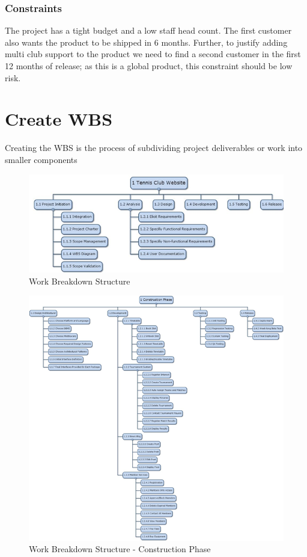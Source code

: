 \subsubsection{Constraints}

The project has a tight budget and a low staff head count. The first customer also wants the product to be shipped in 6 months. Further, to justify adding multi club support to the product we need to find a second customer in the first 12 months of release; as this is a global product, this constraint should be low risk.

\section{Create WBS}

Creating the WBS is the process of subdividing project deliverables or work into smaller components

\begin{figure} [H]
\begin{center}
\includegraphics[scale=0.9]{wbs.png}
\caption{Work Breakdown Structure}
\label{fig:in1}
\end{center}
\end{figure}


\begin{figure} [H]
\begin{center}
\includegraphics[scale=.9]{wbsbig.png}
\caption{Work Breakdown Structure - Construction Phase}
\label{fig:in1}
\end{center}
\end{figure}

